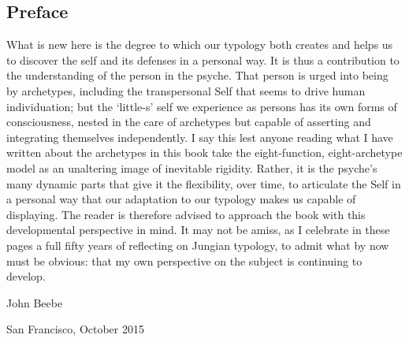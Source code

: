 \subsection*{Preface}

What is new here is the degree to which our typology both creates and helps us
to discover the self and its defenses in a personal way. It is thus a
contribution to the understanding of the person in the psyche. That person is
urged into being by archetypes, including the transpersonal Self that seems to
drive human individuation; but the ‘little-s’ self we experience as persons has
its own forms of consciousness, nested in the care of archetypes but capable of
asserting and integrating themselves independently. I say this lest anyone
reading what I have written about the archetypes in this book take the
eight-function, eight-archetype model as an unaltering image of inevitable
rigidity. Rather, it is the psyche’s many dynamic parts that give it the
flexibility, over time, to articulate the Self in a personal way that our
adaptation to our typology makes us capable of displaying. The reader is
therefore advised to approach the book with this developmental perspective in
mind. It may not be amiss, as I celebrate in these pages a full fifty years of
reflecting on Jungian typology, to admit what by now must be obvious: that my
own perspective on the subject is continuing to develop.

John Beebe

San Francisco, October 2015
